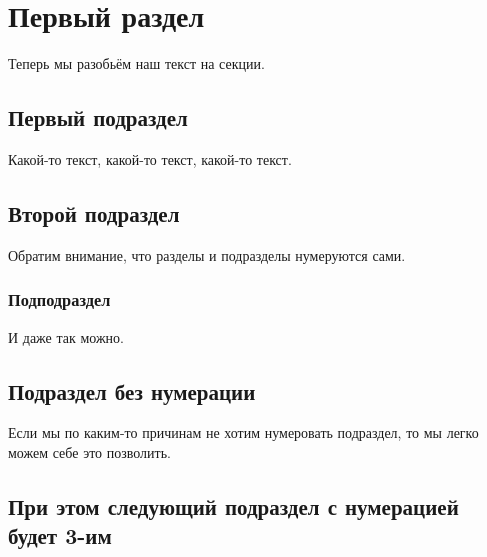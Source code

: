 \documentclass[a4paper, 12pt]{article}
\begin{document}
\section{Первый раздел}
Теперь мы разобьём наш текст на секции.

\subsection{Первый подраздел}
Какой-то текст, какой-то текст, какой-то текст.

\subsection{Второй подраздел}
Обратим внимание, что разделы и подразделы нумеруются сами.

\subsubsection{Подподраздел}
И даже так можно.

\subsection*{Подраздел без нумерации}
Если мы по каким-то причинам не хотим нумеровать подраздел, то мы легко можем себе это позволить.

\subsection{При этом следующий подраздел с нумерацией будет 3-им}
\end{document}
